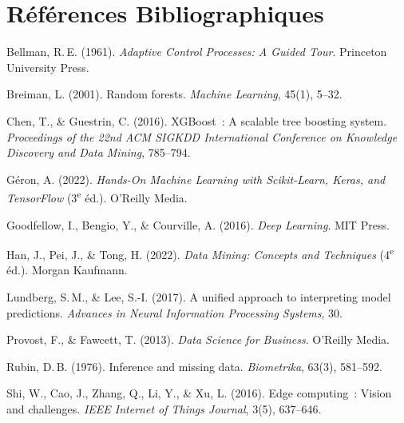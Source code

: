 \chapter*{Références Bibliographiques}

\begin{enumerate}[label={[\arabic*]}, leftmargin=1.5cm, itemsep=5pt]

  \item Bellman, R.\,E. (1961). \textit{Adaptive Control Processes: A Guided Tour}. Princeton University Press.

  \item Breiman, L. (2001). Random forests. \textit{Machine Learning}, 45(1), 5--32.

  \item Chen, T., \& Guestrin, C. (2016). XGBoost~: A scalable tree boosting system. \textit{Proceedings of the 22nd ACM SIGKDD International Conference on Knowledge Discovery and Data Mining}, 785--794.

  \item Géron, A. (2022). \textit{Hands-On Machine Learning with Scikit-Learn, Keras, and TensorFlow} (3\textsuperscript{e} éd.). O'Reilly Media.

  \item Goodfellow, I., Bengio, Y., \& Courville, A. (2016). \textit{Deep Learning}. MIT Press.

  \item Han, J., Pei, J., \& Tong, H. (2022). \textit{Data Mining: Concepts and Techniques} (4\textsuperscript{e} éd.). Morgan Kaufmann.

  \item Lundberg, S.\,M., \& Lee, S.-I. (2017). A unified approach to interpreting model predictions. \textit{Advances in Neural Information Processing Systems}, 30.

  \item Provost, F., \& Fawcett, T. (2013). \textit{Data Science for Business}. O'Reilly Media.

  \item Rubin, D.\,B. (1976). Inference and missing data. \textit{Biometrika}, 63(3), 581--592.

  \item Shi, W., Cao, J., Zhang, Q., Li, Y., \& Xu, L. (2016). Edge computing~: Vision and challenges. \textit{IEEE Internet of Things Journal}, 3(5), 637--646.


\end{enumerate}
